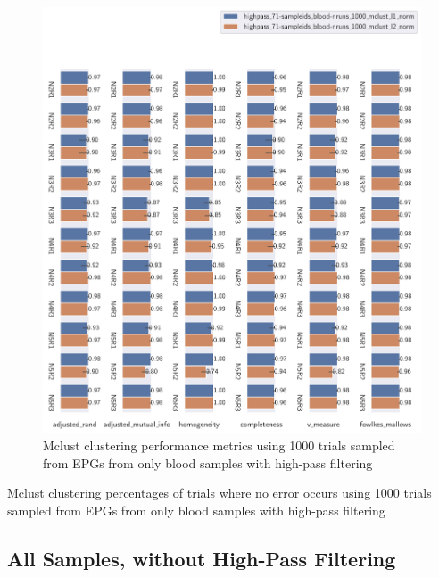 \begin{theappendices}
\begin{figure}[H]
\centering
\includegraphics[width=\textwidth]{./figures/clust_comparison/highpass_71-sampleids_blood-nruns_1000_mclust.pdf}
\caption{Mclust clustering performance metrics using 1000 trials sampled from EPGs from only blood samples with high-pass filtering}
\label{fig:highpass_71-sampleids_blood-nruns_1000_mclust}
\end{figure}

\begin{table}[H]
\centering
{}
\caption{Mclust clustering percentages of trials where no error occurs using 1000 trials sampled from EPGs from only blood samples with high-pass filtering}
\label{table:highpass_71-sampleids_blood-nruns_1000_mclust}
\end{table}

\subsection{All Samples, without High-Pass Filtering}


\end{theappendices}

